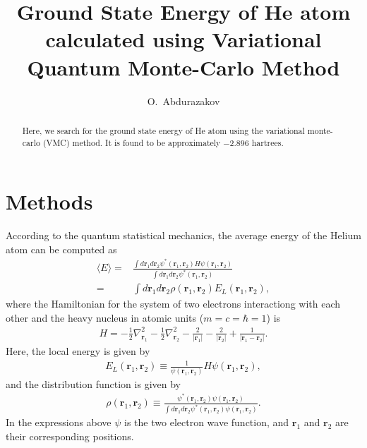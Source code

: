 \documentclass[aps,prb,twocolumn,showpacs,floatfix,superscriptaddress]{revtex4-1}
\begin{document}
\title{Ground State Energy of He atom calculated using Variational Quantum Monte-Carlo Method}
\author{O.~Abdurazakov}

\begin{abstract}
Here, we search for the ground state energy of He atom using the variational monte-carlo (VMC) method. It is found to be approximately $-2.896$ hartrees.
\end{abstract}

\maketitle


\section{Methods}
According to the quantum statistical mechanics, the average energy of the Helium atom can be computed as 
\begin{eqnarray}
\langle E \rangle =& \frac{\int d\textbf{r}_1d\textbf{r}_2 \psi^*(\textbf{r}_1, \textbf{r}_2) H \psi(\textbf{r}_1, \textbf{r}_2)}{\int d\textbf{r}_1d\textbf{r}_2 \psi^*(\textbf{r}_1, \textbf{r}_2)} \\ 
 =& \int d\textbf{r}_1d\textbf{r}_2 \rho(\textbf{r}_1, \textbf{r}_2)E_L(\textbf{r}_1, \textbf{r}_2),
\end{eqnarray}
where the Hamiltonian for the system of two electrons interactiong with each other and the heavy nucleus in atomic units ($m = c = \hbar = 1$) is 
\begin{eqnarray}
H = -\frac{1}{2}\nabla_{\textbf{r}_1}^2 - \frac{1}{2}\nabla_{\textbf{r}_2}^2 - \frac{2}{|\textbf{r}_1|} -\frac{2}{|\textbf{r}_2|} + \frac{1}{|\textbf{r}_1 - \textbf{r}_2|}.
\end{eqnarray}
Here, the local energy is given by
\begin{eqnarray}
E_L(\textbf{r}_1, \textbf{r}_2) \equiv \frac{1}{\psi(\textbf{r}_1, \textbf{r}_2)} H \psi(\textbf{r}_1, \textbf{r}_2),
\end{eqnarray}
and the distribution function is given by 
\begin{eqnarray}
\rho(\textbf{r}_1, \textbf{r}_2) \equiv \frac{\psi^*(\textbf{r}_1, \textbf{r}_2)\psi(\textbf{r}_1, \textbf{r}_2)}{\int d\textbf{r}_1d\textbf{r}_2 \psi^*(\textbf{r}_1, \textbf{r}_2)\psi(\textbf{r}_1, \textbf{r}_2)}.
\end{eqnarray}
In the expressions above $\psi$ is the two electron wave function, and $\textbf{r}_1$ and $\textbf{r}_2$ are their corresponding positions.
\end{document}
